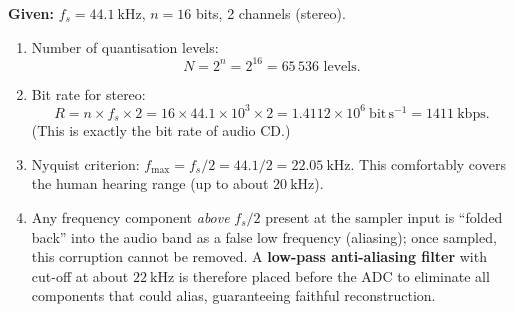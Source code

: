 \documentclass[11pt]{article}
\newcommand{\cle}[1]{{\popxbold\color{popdark}#1}}
\begin{document}
\begin{corrige}
\textbf{Given:} $f_s = 44.1\ \mathrm{kHz}$, $n = 16$ bits, 2 channels (stereo).

\begin{enumerate}
\item Number of quantisation levels:
\[ N = 2^n = 2^{16} = 65\,536 \text{ levels}. \]
\item Bit rate for stereo:
\[ R = n \times f_s \times 2 = 16 \times 44.1\times 10^{3} \times 2
= 1.4112\times 10^{6}\ \mathrm{bit\,s^{-1}} = 1411\ \mathrm{kbps}. \]
(This is exactly the bit rate of audio CD.)
\item Nyquist criterion: $f_{\max} = f_s / 2 = 44.1/2 = 22.05\ \mathrm{kHz}$. This comfortably covers the human hearing range (up to about $20\ \mathrm{kHz}$).
\item Any frequency component \emph{above} $f_s/2$ present at the sampler input is ``folded back'' into the audio band as a false low frequency (\cle{aliasing}); once sampled, this corruption cannot be removed. A \textbf{low-pass anti-aliasing filter} with cut-off at about $22\ \mathrm{kHz}$ is therefore placed before the ADC to eliminate all components that could alias, guaranteeing faithful reconstruction.
\end{enumerate}
\end{corrige}
\end{document}

